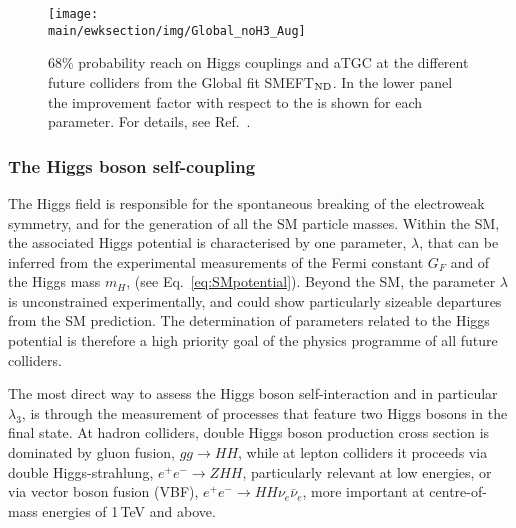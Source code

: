 \documentclass[../report.tex]{subfiles}
\providecommand{\main}{..}
\newcommand{\ew}{electroweak\xspace}
\newcommand{\commentsinout}[1]{#1}
\newcommand{\BH}[1]{\commentsinout{\textbf{\color{blue} [BH: #1]}}} %
\begin{document}

\begin{figure}[t]
\centering
\texttt{[image: \\main/ewksection/img/Global\_noH3\_Aug]}
\caption{\label{fig:EFT-results}
68$\%$ probability reach on Higgs couplings and aTGC at the different future colliders from the Global fit SMEFT$_{\rm ND}$. In the lower panel the improvement factor with respect to the \HLLHC is shown for each parameter. For details, see Ref.~\cite{deBlas:2019rxi}.
}
\end{figure}

\subsubsection*{The Higgs boson self-coupling}
The Higgs field is responsible for the spontaneous breaking of the \ew symmetry, and for the generation of all the SM particle masses.
Within the SM, the associated Higgs potential is characterised by one parameter, $\lambda$, that can be inferred from the experimental measurements of the Fermi constant $G_F$ and of the Higgs mass $m_H$,  (see Eq.~\ref{eq:SMpotential}). Beyond the SM, the parameter $\lambda$ is unconstrained experimentally, and could show particularly sizeable departures from the SM prediction. The determination of parameters related to the Higgs potential is therefore a high priority goal of the physics programme of all future colliders. 

The most direct way to assess the Higgs boson self-interaction and  in particular $\lambda_3$, is through the measurement of processes that feature two Higgs bosons in the final state.  At hadron colliders,  double Higgs boson production cross section is dominated by gluon fusion, $gg\to HH$, while at lepton colliders it proceeds via double Higgs-strahlung,  $e^+e^-\to ZHH$, particularly relevant at low energies, or via vector boson fusion (VBF), $e^+e^-\to HH\nu_e\bar{\nu}_e$, more important at centre-of-mass energies of 1\,TeV and above. 
\end{document}
